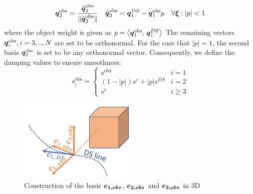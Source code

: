 \documentclass[conference]{IEEEtran}
\begin{document}
\begin{equation}
  \boldsymbol{q}_2^{\mathrm{obs}} = \frac{\hat{\boldsymbol{q}}_2^{\mathrm{obs}}}{\| \hat{\boldsymbol{q}}_2^{\mathrm{obs}} \|}
  \quad
  \hat{\boldsymbol{q}}_2^{\mathrm{obs}} = \boldsymbol{q}_1^{DS} - \boldsymbol{q}_1^{\mathrm{obs}} p \quad  \forall \boldsymbol{\xi} : | p | < 1
\end{equation}
where the object weight is given as $p = \left\langle {\boldsymbol{q}_1^{\mathrm{obs}}}, \, {\boldsymbol{q}_1^{DS}} \right\rangle$
The remaining vectors $\boldsymbol{q}_i^{\mathrm{obs}}, i = 3, .., N$ are set to be orthonormal. For the case that $| p | = 1$, the second basis $\boldsymbol{q}_2^{\mathrm{obs}}$ is set to be any orthonormal vector. 
Consequently, we define the damping values to ensure smoothness:
\begin{equation}
  s_i^{\mathrm{obs}} =
  \begin{cases}
    s^{\mathrm{obs}} & i = 1 \\
    (1 -  | p | ) s^c + | p | s^{DS} & i = 2 \\
    s^c & i \geq 3 
  \end{cases}
\end{equation}

\begin{figure}
\centerline{\includegraphics[width=0.5\textwidth]{figures/fig_basis_3D_DS_obs.png}}
\caption{Construction of the basis $\boldsymbol{e_{1,obs}}$, $\boldsymbol{e_{2,obs}}$ and $\boldsymbol{e_{3,obs}}$ in 3D}
\label{fig_basis_3D_DS_obs}
\end{figure}


\end{document}
